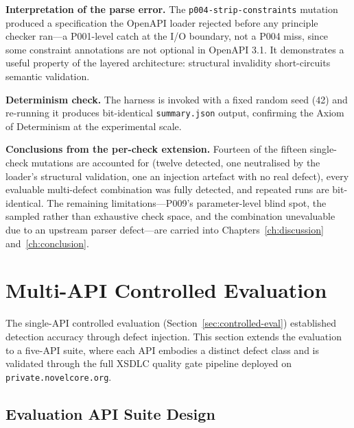 \textbf{Interpretation of the parse error.} The \texttt{p004-strip-constraints} mutation produced a specification the OpenAPI loader rejected before any principle checker ran---a P001-level catch at the I/O boundary, not a P004 miss, since some constraint annotations are not optional in OpenAPI 3.1. It demonstrates a useful property of the layered architecture: structural invalidity short-circuits semantic validation.

\textbf{Determinism check.} The harness is invoked with a fixed random seed (42) and re-running it produces bit-identical \texttt{summary.json} output, confirming the Axiom of Determinism at the experimental scale.

\textbf{Conclusions from the per-check extension.} Fourteen of the fifteen single-check mutations are accounted for (twelve detected, one neutralised by the loader's structural validation, one an injection artefact with no real defect), every evaluable multi-defect combination was fully detected, and repeated runs are bit-identical. The remaining limitations---P009's parameter-level blind spot, the sampled rather than exhaustive check space, and the combination unevaluable due to an upstream parser defect---are carried into Chapters~\ref{ch:discussion} and~\ref{ch:conclusion}.

\section{Multi-API Controlled Evaluation}
\label{sec:multi-api-eval}

The single-API controlled evaluation (Section~\ref{sec:controlled-eval}) established detection accuracy through defect injection. This section extends the evaluation to a five-API suite, where each API embodies a distinct defect class and is validated through the full XSDLC quality gate pipeline deployed on \texttt{private.\allowbreak novelcore.\allowbreak org}.

\subsection{Evaluation API Suite Design}
\label{subsec:api-suite}

